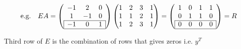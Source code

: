 \documentclass[12pt]{article}
\begin{document}
\[
\text{e.g.}\quad
EA=
\left(
    \begin{array}{*{3}{c}}
        -1 & 2 & 0\\
        1 & -1 & 0\\
        \cline{1-3}
        \multicolumn{1}{|c}{-1} & 0 & \multicolumn{1}{c|}{1}\\
        \cline{1-3}
    \end{array}
\right)
\left(
    \begin{matrix}
        1 & 2 & 3 & 1\\
        1 & 1 & 2 & 1\\
        1 & 2 & 3 & 1\\
    \end{matrix}
\right)
=
\left(
    \begin{array}{*{4}{c}}
        1 & 0 & 1 & 1\\
        0 & 1 & 1 & 0\\
        \cline{1-4}
        \multicolumn{1}{|c}{0} & 0 & 0 & \multicolumn{1}{c|}{0}\\
        \cline{1-4}
    \end{array}
\right)
=R
\]

Third row of $E$ is the combination of rows that gives zeros i.e. $y^T$
\end{document}
